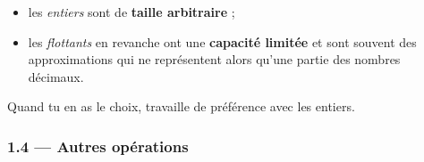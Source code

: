 \documentclass[a4paper,17pt]{extarticle}
\providecommand{\tightlist}{%
      \setlength{\itemsep}{0pt}\setlength{\parskip}{0pt}}
\begin{document}
\begin{itemize}
\tightlist
\item
  les \emph{entiers} sont de \textbf{taille arbitraire} ;
\item
  les \emph{flottants} en revanche ont une \textbf{capacité limitée} et
  sont souvent des approximations qui ne représentent alors qu'une
  partie des nombres décimaux.
\end{itemize}
\begin{retenir}
    Quand tu en as le choix, travaille de préférence avec les entiers.

        \end{retenir}
    \hypertarget{autres-opuxe9rations}{%
\subsubsection{1.4 --- Autres opérations}\label{autres-opuxe9rations}}
\end{document}
